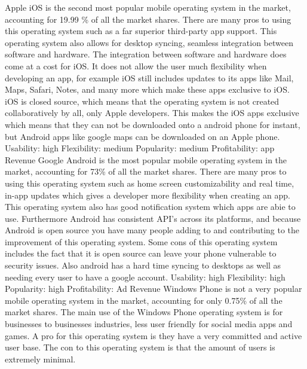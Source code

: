 \documentclass[letterpaper, 10, draftclsnofoot, onecolumn]{IEEEtran}
\begin{document}
\indent Apple iOS is the second most popular mobile operating system in the market, accounting for 19.99 \% of all the market shares. There are many pros to using this operating system such as a far superior third-party app support. This operating system also allows for desktop syncing, seamless integration between software and hardware. The integration between software and hardware does come at a cost for iOS. It does not allow the user much flexibility when developing an app, for example iOS still includes updates to its apps like Mail, Maps, Safari, Notes, and many more which make these apps exclusive to iOS. iOS is closed source, which means that the operating system is not created collaboratively by all, only Apple developers. This makes the  iOS apps exclusive which means that they can not be downloaded onto a android phone for instant, but Android apps like google maps can be downloaded on an Apple phone.
\newline
\newline
Usability: high
\newline
Flexibility: medium
\newline
Popularity: medium
\newline
Profitability: app Revenue
\newline
\newline
\indent Google Android is the most popular mobile operating system in the market, accounting for 73\% of all the market shares. There are many pros to using this operating system such as home screen customizability and real time, in-app updates which gives a developer more flexibility when creating an app. This operating system also has good notification system which apps are abie to use. Furthermore Android has consistent API’s across its platforms, and because Android is open source you have many people adding to and contributing to the improvement of this operating system. Some cons of this operating system includes the fact that it is open source can leave your phone vulnerable to security issues. Also android has a hard time syncing to desktops as well as needing every user to have a google account.
\newline
\newline
Usability: high
\newline
Flexibility: high
\newline
Popularity: high
\newline
Profitability: Ad Revenue
\newline
\newline
\indent Windows Phone is not a very popular mobile operating system in the market, accounting for only 0.75\% of all the market shares. The main use of the Windows Phone operating system is for businesses to businesses industries, less user friendly for social media apps and games. A pro for this operating system is they have a very committed and active user base. The con to this operating system is that the amount of users is extremely minimal.  
\end{document}
